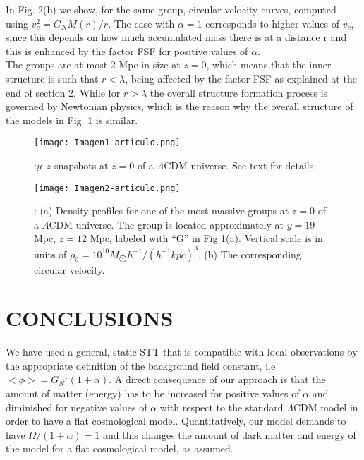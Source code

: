 \documentclass[10pt,times]{IEEEtran}
\begin{document}
In Fig. 2(b) we show, for the same group, circular velocity curves, computed using \(v_{c}^{2}=G_{N}M(r)/r\). The
case with \(\alpha=1\) corresponds to higher values of $v_{c}$, since
this depends on how much accumulated mass there is at a distance r and this is enhanced by the factor FSF for
positive values of \(\alpha\).\\

The groups are at most 2 Mpc in size at $z = 0$, which means that the inner structure is such that \(r<\lambda\), being affected by the factor FSF as explained at the end of section 2. While for \(r>\lambda\) the overall structure formation process is governed by Newtonian physics, which is the reason why the overall structure of the models in Fig. 1 is similar.\\

\begin{figure}[H] 
  \texttt{[image: Imagen1-articulo.png]}
  \centering
  \caption{:$y–z$ snapshots at $z = 0$ of a \(\Lambda\)CDM universe. See text for details.}
  \label{fig:ondas.jpg.}
\end{figure}

\begin{figure}[H] 
  \texttt{[image: Imagen2-articulo.png]}
  \centering
  \caption{: (a) Density profiles for one of the most massive groups
at $z = 0$ of a \(\Lambda\)CDM universe. The group is located approximately at $y = 19$ Mpc, $z = 12$ Mpc, labeled with “G” in Fig
1(a). Vertical scale is in units of \(\rho_{0} = 10^{10}M_{\bigodot}h^{-1}/(h^{-1}kpc)^{3}\). (b) The corresponding circular velocity.}
  \label{fig:ondas.jpg.}
\end{figure}

\section{\textbf{CONCLUSIONS}}
We have used a general, static STT that is compatible
with local observations by the appropriate definition of
the background field constant, i.e \(<\phi>=G_{N}^{-1}(1+\alpha)\). A  direct consequence of our approach is that the amount of matter (energy) has to be increased for positive values of \(\alpha\) and diminished for negative values of \(\alpha\) with respect to the standard \(\Lambda\)CDM model in order to have a flat cosmological model. Quantitatively, our model demands to have \(\Omega/(1+\alpha)=1\) and this changes the amount of dark matter and energy of the model for a flat cosmological model, as assumed.\\
\end{document}
